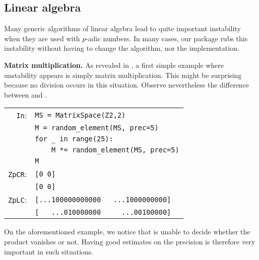 \documentclass[sigconf]{acmart}
\newcommand{\ZpCR}{\text{\color{output} \rm \tt ZpCR}\xspace}
\newcommand{\ZpL}{\text{\color{output} \rm \tt ZpL}\xspace}
\newcommand{\ZpLC}{\text{\color{output} \rm \tt ZpLC}\xspace}
\newcommand{\cIn}{{\color{input} \tt \phantom{Zp}In}:}
\newcommand{\cZpCR}{{\color{output} \tt ZpCR}:}
\newcommand{\cZpLC}{{\color{output} \tt ZpLC}:}
\theoremstyle{definition}
\begin{document}
\subsection{Linear algebra}

Many generic algorithms of linear algebra lead to quite important 
instability when they are used with $p$-adic numbers. In many cases, 
our package \ZpL rubs this instability without having to change the 
algorithm, nor the implementation.

\medskip

\noindent \textbf{Matrix multiplication.}
%
As revealed in \cite{caruso-roe-vaccon:15}, a first simple example where 
unstability appears is simply matrix multiplication.
This might be surprising because no division occurs in this situation.
Observe nevertheless the difference between \ZpCR and \ZpLC.

\smallskip

{\noindent \small
\begin{tabular}{rl}
\cIn
 & \verb?MS = ?{\color{constructor}\verb?MatrixSpace?}\verb?(?{\color{ring}\verb?Z2?}\verb?,2)? \\
 & \verb?M = ?{\color{function}\verb?random_element?}\verb?(MS, prec=5)? \\
 & \verb?for _ in range(25):? \\
 & \verb?    M *= ?{\color{function}\verb?random_element?}\verb?(MS, prec=5)? \\
 & \verb?M? \\
\cZpCR
 & \verb?[0 0]? \\
 & \verb?[0 0]? \\
\cZpLC
 & \verb?[...100000000000   ...1000000000]? \\
 & \verb?[   ...010000000     ...00100000]? \\
\end{tabular}}


\smallskip

\noindent
On the aforementioned example, we notice that \ZpCR is unable to decide 
whether the product vanishes or not. Having good estimates on the 
precision is therefore very important in such situations.
\end{document}
